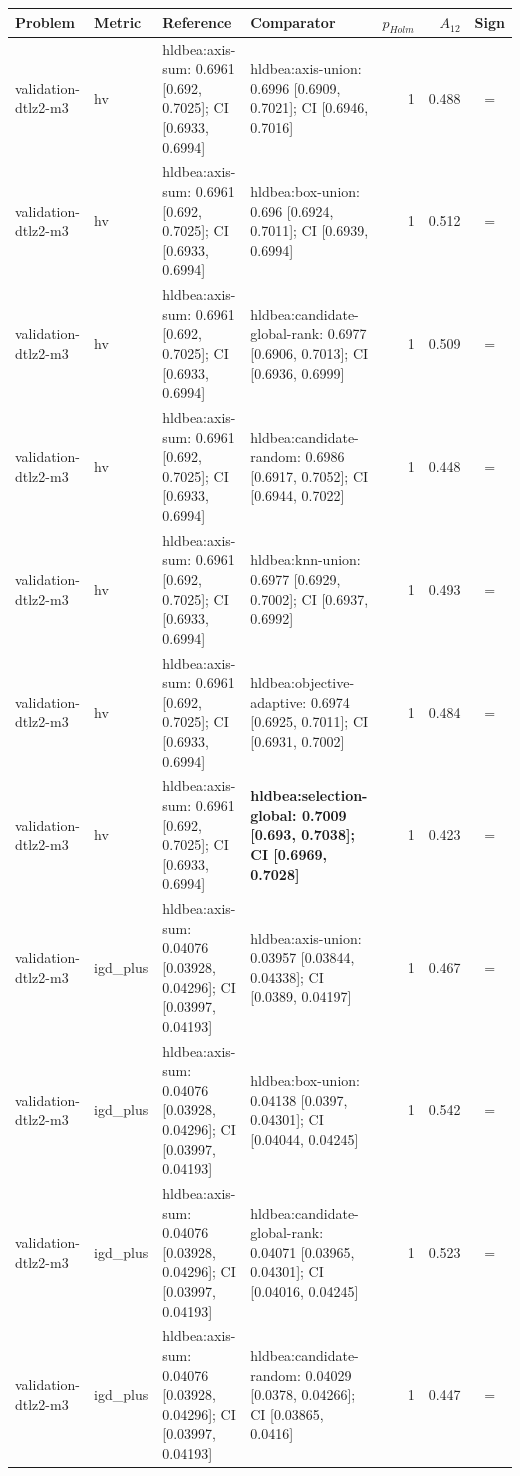 \begin{tabular}{llllrrc}
\toprule
Problem & Metric & Reference & Comparator & $p_{Holm}$ & $A_{12}$ & Sign \\
\midrule
validation-dtlz2-m3 & hv & hldbea:axis-sum: 0.6961 [0.692, 0.7025]; CI [0.6933, 0.6994] & hldbea:axis-union: 0.6996 [0.6909, 0.7021]; CI [0.6946, 0.7016] & 1 & 0.488 & = \\
validation-dtlz2-m3 & hv & hldbea:axis-sum: 0.6961 [0.692, 0.7025]; CI [0.6933, 0.6994] & hldbea:box-union: 0.696 [0.6924, 0.7011]; CI [0.6939, 0.6994] & 1 & 0.512 & = \\
validation-dtlz2-m3 & hv & hldbea:axis-sum: 0.6961 [0.692, 0.7025]; CI [0.6933, 0.6994] & hldbea:candidate-global-rank: 0.6977 [0.6906, 0.7013]; CI [0.6936, 0.6999] & 1 & 0.509 & = \\
validation-dtlz2-m3 & hv & hldbea:axis-sum: 0.6961 [0.692, 0.7025]; CI [0.6933, 0.6994] & hldbea:candidate-random: 0.6986 [0.6917, 0.7052]; CI [0.6944, 0.7022] & 1 & 0.448 & = \\
validation-dtlz2-m3 & hv & hldbea:axis-sum: 0.6961 [0.692, 0.7025]; CI [0.6933, 0.6994] & hldbea:knn-union: 0.6977 [0.6929, 0.7002]; CI [0.6937, 0.6992] & 1 & 0.493 & = \\
validation-dtlz2-m3 & hv & hldbea:axis-sum: 0.6961 [0.692, 0.7025]; CI [0.6933, 0.6994] & hldbea:objective-adaptive: 0.6974 [0.6925, 0.7011]; CI [0.6931, 0.7002] & 1 & 0.484 & = \\
validation-dtlz2-m3 & hv & hldbea:axis-sum: 0.6961 [0.692, 0.7025]; CI [0.6933, 0.6994] & \textbf{hldbea:selection-global: 0.7009 [0.693, 0.7038]; CI [0.6969, 0.7028]} & 1 & 0.423 & = \\
validation-dtlz2-m3 & igd\_plus & hldbea:axis-sum: 0.04076 [0.03928, 0.04296]; CI [0.03997, 0.04193] & hldbea:axis-union: 0.03957 [0.03844, 0.04338]; CI [0.0389, 0.04197] & 1 & 0.467 & = \\
validation-dtlz2-m3 & igd\_plus & hldbea:axis-sum: 0.04076 [0.03928, 0.04296]; CI [0.03997, 0.04193] & hldbea:box-union: 0.04138 [0.0397, 0.04301]; CI [0.04044, 0.04245] & 1 & 0.542 & = \\
validation-dtlz2-m3 & igd\_plus & hldbea:axis-sum: 0.04076 [0.03928, 0.04296]; CI [0.03997, 0.04193] & hldbea:candidate-global-rank: 0.04071 [0.03965, 0.04301]; CI [0.04016, 0.04245] & 1 & 0.523 & = \\
validation-dtlz2-m3 & igd\_plus & hldbea:axis-sum: 0.04076 [0.03928, 0.04296]; CI [0.03997, 0.04193] & hldbea:candidate-random: 0.04029 [0.0378, 0.04266]; CI [0.03865, 0.0416] & 1 & 0.447 & = \\

\end{tabular}
